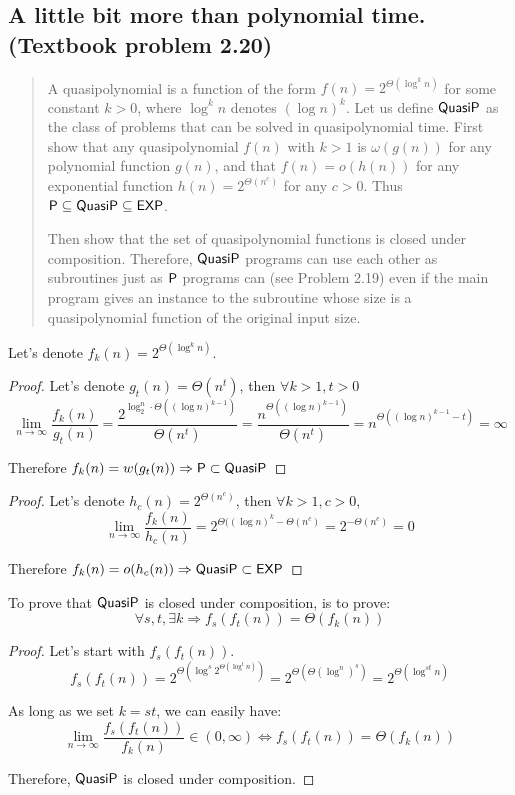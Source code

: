 \subsection*{A little bit more than polynomial time. (Textbook problem 2.20)}
    \begin{quote}
    A quasipolynomial is a function of the form $f(n) = 2^{\Theta(\log^k n)}$ for some constant $k > 0$, where $\log^k n$ denotes $(\log n)^k$.
    Let us define $\QuasiP$ as the class of problems that can be solved in quasipolynomial time.
    First show that any quasipolynomial $f(n)$ with $k > 1$ is $\omega(g(n))$ for any polynomial function $g(n)$,
    and that $f(n) = o(h(n))$ for any exponential function $h(n) = 2^{\Theta(n^c)}$ for any $c > 0$.
    Thus $\P \subseteq \QuasiP \subseteq \EXP$.

    Then show that the set of quasipolynomial functions is closed under composition.
    Therefore, $\QuasiP$ programs can use each other as subroutines just as $\P$ programs can (see Problem 2.19)
    even if the main program gives an instance to the subroutine whose size is a quasipolynomial function of the original input size.
    \end{quote}

 \solution

    Let's denote $f_k(n) =  2^{\Theta(\log^k n)}$.
\begin{proof}
    Let's denote $g_t(n) = \Theta(n^t)$, then $\forall k>1, t>0$
    $$\lim_{n \to \infty} \frac{f_k(n)}{g_t(n)} = \frac{2^{\log_2^n \cdot \Theta((\log n)^{k-1})}} {\Theta(n^t)} = \frac{n^{\Theta((\log n)^{k-1})}}{\Theta(n^t)} = n^{\Theta((\log n)^{k-1} - t)} = \infty$$

    Therefore $f_k(n) = w(g_t(n)) \Rightarrow \P \subset \QuasiP$
\end{proof}

\begin{proof}
    Let's denote $h_c(n) = 2^{\Theta(n^c)}$, then $\forall k>1, c>0$,
    $$\lim_{n \to \infty} \frac{f_k(n)}{h_c(n)} = 2^{\Theta((\log n)^k - \Theta(n^c)} = 2^{-\Theta(n^c)} = 0$$

    Therefore $f_k(n) = o(h_c(n)) \Rightarrow \QuasiP \subset \EXP$
\end{proof}

To prove that $\QuasiP$ is closed under composition, is to prove: 
    $$\forall s, t, \exists k \Rightarrow f_s(f_t(n)) = \Theta(f_k(n))$$
\begin{proof}
    Let's start with $f_s(f_t(n))$.
    $$f_s(f_t(n)) = 2^{\Theta(\log^s 2^{\Theta(\log^t n)})} = 2^{\Theta(\Theta(\log^ n)^s)} = 2^{\Theta(\log^{st} n)}$$

    As long as we set $k = st$, we can easily have:
    $$\lim_{n \to \infty} \frac{f_s(f_t(n))}{f_k(n)} \in (0, \infty) \Leftrightarrow f_s(f_t(n)) = \Theta(f_k(n))$$

    Therefore, $\QuasiP$ is closed under composition.
\end{proof}
